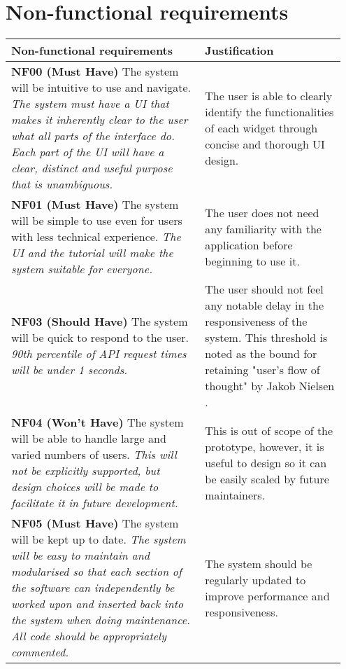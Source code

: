 \documentclass[10pt]{article}
\begin{document}
\vspace{-4mm}\section{Non-functional requirements}\vspace{-2mm}
\begin{longtable}{|p{0.55\linewidth}|p{0.4\linewidth}|}
    \hline
    \textbf{Non-functional requirements}
        &
    \textbf{Justification}
    \\ \hline\hline

    \textbf{NF00 (Must Have) }
    The system will be intuitive to use and navigate.
    \textit{The system must have a UI that makes it inherently clear to the user
    what all parts of the interface do. Each part of the UI will have a clear,
    distinct and useful purpose that is unambiguous.}
        &
    The user is able to clearly identify the functionalities of each widget
    through concise and thorough UI design.
    \\ \hline

    \textbf{NF01 (Must Have) }
    The system will be simple to use even for users with less technical experience.
    \textit{The UI and the tutorial will make the system suitable for everyone.}
        &
    The user does not need any familiarity with the application before beginning
    to use it.
    \\ \hline

    \textbf{NF03 (Should Have) }
    The system will be quick to respond to the user.
    \textit{90th percentile of API request times will be under 1 seconds.}
        &
    The user should not feel any notable delay in the responsiveness of the
    system. This threshold is noted as the bound for retaining "user's flow
    of thought" by Jakob Nielsen \cite{usability_engineering}.
    \\ \hline

    \textbf{NF04 (Won't Have) }
    The system will be able to handle large and varied numbers of users.
    \textit{This will not be explicitly supported, but design choices will be
    made to facilitate it in future development.}
        &
    This is out of scope of the prototype, however, it is useful to design so
    it can be easily scaled by future maintainers.
    \\ \hline

    \textbf{NF05 (Must Have) }
    The system will be kept up to date.
    \textit{The system will be easy to maintain and modularised so that each        %
    section of the software can independently be worked upon and inserted back
    into the system when doing maintenance. All code should be appropriately
    commented.}
        &
    The system should be regularly updated to improve performance and
    responsiveness.
    \\ \hline


\end{longtable}
\end{document}
